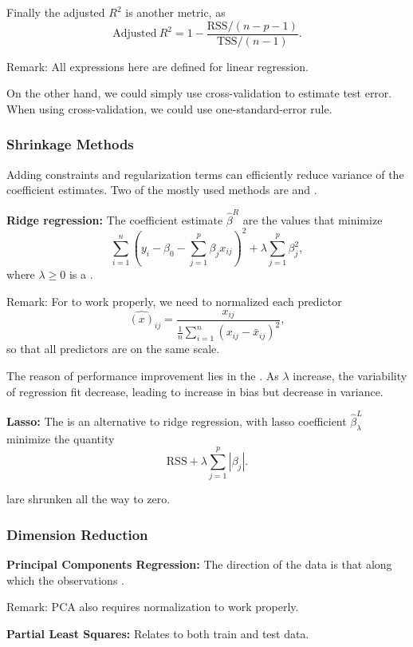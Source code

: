 Finally the adjusted $R^2$ is another metric, as $$ \text{Adjusted}\ R^2=1 - \frac{\text{RSS}/(n-p-1)}{\text{TSS}/(n-1)}.$$
\begin{tbox}
Remark: All expressions here are defined for linear regression.
\end{tbox}

On the other hand, we could simply use cross-validation to estimate test error. When using cross-validation, we could use one-standard-error rule.
\subsubsection{Shrinkage Methods}
Adding constraints and regularization terms can efficiently reduce variance of the coefficient estimates. Two of the mostly used methods are  and . 

\textbf{Ridge regression:}
The  coefficient estimate $\hat{\beta}^R$ are the values that minimize $$ \sum_{i=1}^{n}(y_i-\beta_0 -\sum_{j=1}^p\beta_jx_{ij})^2 + \lambda\sum_{j=1}^{p}\beta_j^2,$$ where $\lambda \geq 0$ is a .

\begin{tbox}
Remark: For  to work properly, we need to normalized each predictor $$ \hat{(x)}_{ij} = \frac{x_{ij}}{\frac{1}{n}\sum_{i=1}^{n}(x_{ij}-\bar{x}_{ij})^2},$$ so that all predictors are on the same scale.
\end{tbox}

The reason of performance improvement lies in the . As $\lambda$ increase, the variability of regression fit decrease, leading to increase in bias but decrease in variance.

\textbf{Lasso:}
The  is an alternative to ridge regression, with lasso coefficient $\hat{\beta}^L_\lambda$ minimize the quantity $$ \text{RSS} + \lambda \sum_{j=1}^{p}|\beta_j|.$$
\begin{tbox}
lare shrunken all the way to zero.
\end{tbox}
\subsubsection{Dimension Reduction}
\textbf{Principal Components Regression:} The  direction of the data is that along which the observations .
\begin{tbox}
Remark: PCA also requires normalization to work properly.
\end{tbox}
\textbf{Partial Least Squares:} Relates to both train and test data.
